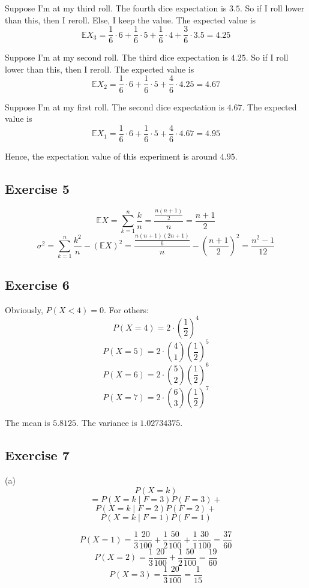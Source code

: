 \documentclass{book}
\begin{document}
Suppose I'm at my third roll. The fourth dice expectation is $3.5$. So if I roll lower than this, then I reroll. Else, I keep the value. The expected value is
$$\mathbb{E} X_3 = \frac{1}{6} \cdot 6 + \frac{1}{6} \cdot 5 + \frac{1}{6} \cdot 4 + \frac{3}{6} \cdot 3.5 = 4.25$$

Suppose I'm at my second roll. The third dice expectation is $4.25$. So if I roll lower than this, then I reroll. The expected value is
$$\mathbb{E} X_2 = \frac{1}{6} \cdot 6 + \frac{1}{6} \cdot 5 + \frac{4}{6} \cdot 4.25 = 4.67$$

Suppose I'm at my first roll. The second dice expectation is $4.67$. The expected value is
$$\mathbb{E} X_1 = \frac{1}{6} \cdot 6 + \frac{1}{6} \cdot 5 + \frac{4}{6} \cdot 4.67 = 4.95$$

Hence, the expectation value of this experiment is around $4.95$.

\subsection*{Exercise 5}
$$\mathbb{E} X = \sum_{k = 1}^n \frac{k}{n} = \frac{\frac{n(n + 1)}{2}}{n} = \frac{n + 1}{2}$$
$$\sigma^2 = \sum_{k = 1}^n \frac{k^2}{n} - (\mathbb{E} X)^2 = \frac{\frac{n(n + 1)(2n + 1)}{6}}n - \left(\frac{n + 1}{2}\right)^2 = \frac{n^2 - 1}{12}$$

\subsection*{Exercise 6}
Obviously, $P(X < 4) = 0$. For others:
$$P(X = 4) = 2 \cdot \left(\frac{1}{2}\right)^4$$
$$P(X = 5) = 2 \cdot \binom{4}{1} \left(\frac{1}{2}\right)^5$$
$$P(X = 6) = 2 \cdot \binom{5}{2} \left(\frac{1}{2}\right)^6$$
$$P(X = 7) = 2 \cdot \binom{6}{3} \left(\frac{1}{2}\right)^7$$

The mean is $5.8125$. The variance is $1.02734375$.

\subsection*{Exercise 7}
(a)
$$P(X = k)$$
$$=P(X = k \mid F = 3) P(F = 3) +$$
$$P(X = k \mid F = 2) P(F = 2) +$$
$$P(X = k \mid F = 1) P(F = 1)$$

$$P(X = 1) = \frac{1}{3} \frac{20}{100} + \frac{1}{2} \frac{50}{100} + \frac{1}{1} \frac{30}{100} = \frac{37}{60}$$
$$P(X = 2) = \frac{1}{3} \frac{20}{100} + \frac{1}{2} \frac{50}{100} = \frac{19}{60}$$
$$P(X = 3) = \frac{1}{3} \frac{20}{100} = \frac{1}{15}$$
\end{document}

